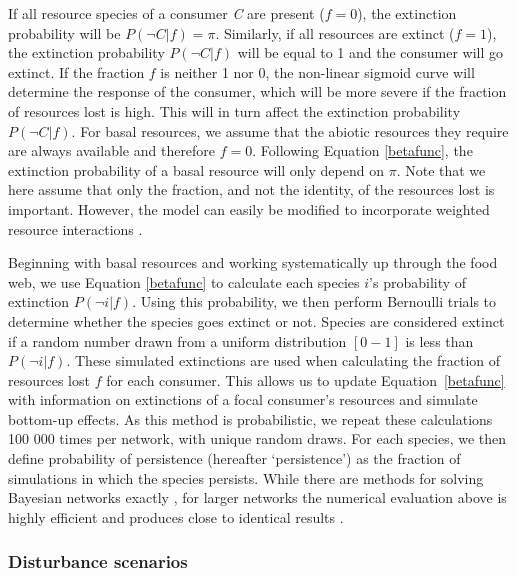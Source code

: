 \documentclass[12pt]{article}
\begin{document}
\begin{spacing}{2.0}
		If all resource species of a consumer \textit{C} are present ($f = 0$), the extinction probability will be $P(\lnot C|f) = \pi$. 
		Similarly, if all resources are extinct ($f = 1$), the extinction probability $P(\lnot C|f)$ will be equal to 1 and the consumer will go extinct.
		If the fraction $f$ is neither 1 nor 0, the non-linear sigmoid curve will determine the response of the consumer, which will be more severe if the fraction of resources lost is high. This will in turn affect the extinction probability $P(\lnot C|f)$.
		For basal resources, we assume that the abiotic resources they require are always available and therefore $f=0$. 
		Following Equation \ref{betafunc}, the extinction probability of a basal resource will only depend on $\pi$.
		Note that we here assume that only the fraction, and not the identity, of the resources lost is important. 
		However, the model can easily be modified to incorporate weighted resource interactions \citep[see][]{Eklof2013}.
		
		
        Beginning with basal resources and working systematically up through the food web, we use Equation \ref{betafunc} to calculate each species $i$'s probability of extinction $P(\lnot i|f)$.
        Using this probability, we then perform Bernoulli trials to determine whether the species goes extinct or not. 
        Species are considered extinct if a random number drawn from a uniform distribution $[0-1]$ is less than $P(\lnot i|f)$.
        These simulated extinctions are used when calculating the fraction of resources lost $f$ for each consumer.
        This allows us to update Equation~\ref{betafunc} with information on extinctions of a focal consumer's resources and simulate bottom-up effects. As this method is probabilistic, we repeat these calculations 100 000 times per network, with unique random draws.
        For each species, we then define probability of persistence (hereafter `persistence') as the fraction of simulations in which the species persists. 
        While there are methods for solving Bayesian networks exactly \citep{Eklof2013}, for larger networks the numerical evaluation above is highly efficient and produces close to identical results \citep{Haussler2020}.
		
	
		
        \subsubsection*{Disturbance scenarios}
        

\end{spacing}
\end{document}
